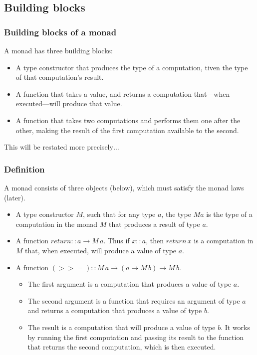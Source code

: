 \documentclass{beamer}
\begin{document}
\subsection{Building blocks}

\begin{frame}[fragile]
\frametitle{Building blocks of a monad}

A monad has three building blocks:

\begin{itemize}
\item A type constructor that produces the type of a computation,
  tiven the type of that computation's result.
\item A function that takes a value, and returns a computation
  that---when executed---will produce that value.
\item A function that takes two computations and performs them one
  after the other, making the result of the first computation
  available to the second.
\end{itemize}

This will be restated more precisely$\ldots$

\end{frame}


\begin{frame}[fragile]
\frametitle{Definition}

A monad consists of three objects (below), which must satisfy the
monad laws (later).

\begin{itemize}
\item A type constructor $M$, such that for any type $a$, the type
  $M a$ is the type of a computation in the monad $M$ that produces
  a result of type $a$.
\item A function $return :: a \rightarrow M\, a$.  Thus if $x::a$, then
  $return \, x$ is a computation in $M$ that, when executed, will
  produce a value of type $a$.
\item A function $(>>=) :: M\, a \rightarrow  (a \rightarrow  M\, b) \rightarrow  M\, b$.
  \begin{itemize}
  \item The first argument is a computation that produces a value
    of type $a$.
  \item The second argument is a function that requires an argument
    of type $a$ and returns a computation that produces a value of
    type $b$.
  \item The result is a computation that will produce a value of
    type $b$.  It works by running the first computation and
    passing its result to the function that returns the second
    computation, which is then executed.
  \end{itemize}
\end{itemize}

\end{frame}
\end{document}
